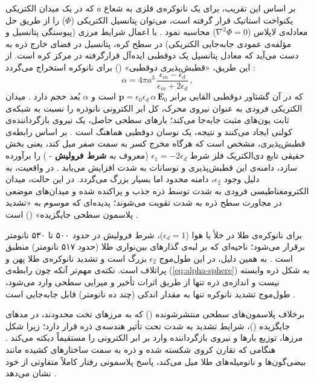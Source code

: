 \documentclass[12pt,a4paper]{report}
\begin{document}
بر اساس این تقریب، برای یک نانوکره‌ی فلزی به شعاع $a$ که در یک میدان الکتریکی یکنواخت استاتیک قرار گرفته است، می‌توان پتانسیل الکتریکی ($\Phi$) را از طریق حل معادله‌ی لاپلاس ($\nabla^2\Phi=0$) محاسبه نمود \cite{maier,novotny}. با اعمال شرایط مرزی (پیوستگی پتانسیل و مؤلفه‌ی عمودی جابه‌جایی الکتریکی) در سطح کره، پتانسیل در فضای خارج ذره به دست می‌آید که معادل پتانسیل یک دوقطبی ایده‌آل قرارگرفته در مرکز کره است. از این طریق، «قطبش‌پذیری دوقطبی» () برای نانوکره استخراج می‌گردد \cite{maier,novotny,bohren}:
\begin{equation}\label{eq:alpha-sphere}
\alpha=4\pi a^3\,\frac{\epsilon_m-\epsilon_d}{\epsilon_m+2\epsilon_d}\,,
\end{equation}
که در آن گشتاور دوقطبی القایی برابر $\mathbf{p}=\epsilon_0\epsilon_d\,\alpha\,\mathbf{E}_0$ است و $\alpha$ بُعد حجم دارد \cite{maier}. میدان الکتریکی فرودی به عنوان نیروی محرک، کل ابر الکترونی نانوذره را نسبت به شبکه‌ی ثابت یون‌های مثبت جابه‌جا می‌کند؛ بارهای سطحی حاصل، یک نیروی بازگرداننده‌ی کولنی ایجاد می‌کنند و نتیجه، یک نوسان دوقطبی هماهنگ است \cite{maier}. بر اساس رابطه‌ی قطبش‌پذیری، مشخص است که هرگاه مخرج کسر به سمت صفر میل کند، یعنی بخش حقیقی تابع دی‌الکتریک فلز شرط $\epsilon_1=-2\epsilon_d$ (معروف به \textbf{شرط فرولیش} - ) را برآورده سازد، دامنه‌ی این قطبش‌پذیری و نوسانات به شدت افزایش می‌یابد \cite{maier,novotny}. در واقعیت، به دلیل وجود $\epsilon_2$، دامنه محدود اما بسیار بزرگ می‌گردد. در این حالت، میدان الکترومغناطیسی فرودی به شدت توسط ذره جذب و پراکنده شده و میدان‌های موضعی در مجاورت سطح ذره به شدت تقویت می‌شوند؛ پدیده‌ای که موسوم به «تشدید پلاسمون سطحی جایگزیده» () است \cite{maier,novotny}.

برای نانوکره‌ی طلا در خلأ یا هوا ($\epsilon_d=1$)، شرط فرولیش در حدود ۵۰۰ تا ۵۳۰ نانومتر برقرار می‌شود؛ ناحیه‌ای که بر لبه‌ی گذارهای بین‌نواری طلا (حدود ۵۱۷ نانومتر) منطبق است \cite{kreibig,link,jc}. به همین دلیل، در این طول‌موج $\epsilon_2$ بزرگ است و تشدید نانوکره‌ی طلا پهن و پراتلاف است. نکته‌ی مهم‌تر آنکه چون رابطه‌ی (\ref{eq:alpha-sphere}) به شکل ذره وابسته نیست و اندازه‌ی ذره تنها از طریق اثرات تأخیر و میرایی سطحی وارد می‌شود، طول‌موج تشدید نانوکره تنها به مقدار اندکی (چند ده نانومتر) قابل جابه‌جایی است \cite{kreibig,bohren}.

برخلاف پلاسمون‌های سطحی منتشرشونده () که به مرزهای تخت محدودند، در مدهای جایگزیده ()، شرایط تشدید به شدت تحت تأثیر هندسه‌ی ذره قرار دارد؛ زیرا شکل مرزها، توزیع بارها و نیروی بازگرداننده وارد بر ابر الکترونی را مستقیماً دیکته می‌کند \cite{maier,novotny}. هنگامی که تقارن کروی شکسته شده و ذره به سمت ساختارهای کشیده مانند بیضی‌گون‌ها و نانومیله‌های طلا میل می‌کند، پاسخ پلاسمونی رفتار کاملاً متفاوتی از خود نشان می‌دهد \cite{maier,giannini}.
\end{document}
